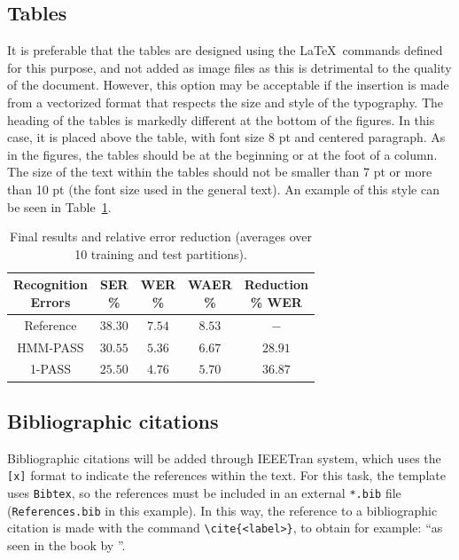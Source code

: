 \documentclass[eng,blind]{ajceam-class}
\begin{document}
\subsection{Tables}

It is preferable that the tables are designed using the \LaTeX\ commands defined for this purpose, and not added as image files as this is detrimental to the quality of the document. However, this option may be acceptable if the insertion is made from a vectorized format that respects the size and style of the typography. The heading of the tables is markedly different at the bottom of the figures. In this case, it is placed above the table, with font size 8 pt and centered paragraph. As in the figures, the tables should be at the beginning or at the foot of a column. The size of the text within the tables should not be smaller than 7 pt or more than 10 pt (the font size used in the general text). An example of this style can be seen in Table~\ref{table-1}.

\begin{table}[!b]
 \centering
  \caption{Final results and relative error reduction (averages over 10 training and test partitions).} \label{table-1}
 {\small
 \begin{tabular}{ccccc}
  \hline
  \hline
  \thead{Recognition \\ Errors} & \thead{SER \\ \%} & \thead{WER \\ \%} & \thead{WAER \\ \%} &
                        \thead{Reduction \\ \% WER} \\
  \hline
  \hline
  Reference & $38.30$ & $7.54$ & $8.53$ & $-$ \\
  \hline
  HMM-PASS & $30.55$ & $5.36$ & $6.67$ & $28.91$ \\
  1-PASS & $25.50$ & $4.76$ & $5.70$ & $36.87$   \\
  \hline
  \hline
 \end{tabular}}
\end{table}

\subsection{Bibliographic citations}

Bibliographic citations will be added through IEEETran system, which uses the \texttt{[x]} format to indicate the references within the text. For this task, the template uses \texttt{Bibtex}, so the references must be included in an external \texttt{*.bib} file (\texttt{References.bib} in this example). In this way, the reference to a bibliographic citation is made with the command \verb!\cite{<label>}!, to obtain for example: ``as seen in the book by \cite{Mitchell2001}''.
\end{document}
